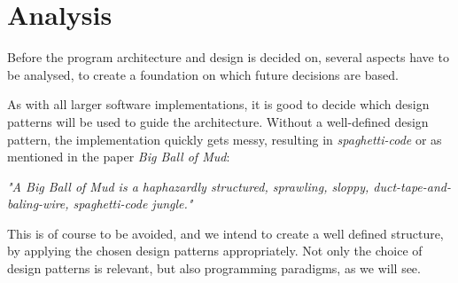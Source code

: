 \chapter{Analysis}\label{ch:Analysis}

Before the program architecture and design is decided on, several aspects have to be analysed, to create a foundation on which future decisions are based. 

As with all larger software implementations, it is good to decide which design patterns will be used to guide the architecture. Without a well-defined design pattern, the implementation quickly gets messy, resulting in \emph{spaghetti-code} or as mentioned in the paper \emph{Big Ball of Mud}:

\begin{center}
    \textit{"A Big Ball of Mud is a haphazardly structured, sprawling, sloppy, duct-tape-and-baling-wire, spaghetti-code jungle."\cite{BallOfMud}}
\end{center}

This is of course to be avoided, and we intend to create a well defined structure, by applying the chosen design patterns appropriately. Not only the choice of design patterns is relevant, but also programming paradigms, as we will see.